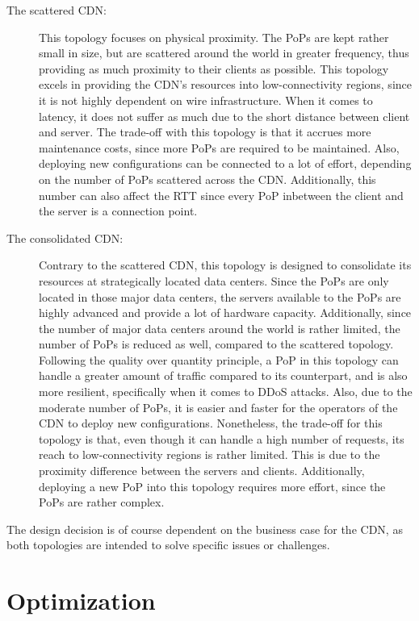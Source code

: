 \begin{description}
	\item[The scattered CDN:] This topology focuses on physical proximity. The PoPs are kept rather small in size, but are scattered around the world in greater frequency, thus providing as much proximity to their clients as possible. This topology excels in providing the CDN's resources into low-connectivity regions, since it is not highly dependent on wire infrastructure. When it comes to latency, it does not suffer as much due to the short distance between client and server. The trade-off with this topology is that it accrues more maintenance costs, since more PoPs are required to be maintained. Also, deploying new configurations can be connected to a lot of effort, depending on the number of PoPs scattered across the CDN. 
	Additionally, this number can also affect the RTT since every PoP inbetween the client and the server is a connection point.
	
	\item[The consolidated CDN:] Contrary to the scattered CDN, this topology is designed to consolidate its resources at strategically located data centers. Since the PoPs are only located in those major data centers, the servers available to the PoPs are highly advanced and provide a lot of hardware capacity. Additionally, since the number of major data centers around the world is rather limited, the number of PoPs is reduced as well, compared to the scattered topology. Following the quality over quantity principle, a PoP in this topology can handle a greater amount of traffic compared to its counterpart, and is also more resilient, specifically when it comes to DDoS attacks. Also, due to the moderate number of PoPs, it is easier and faster for the operators of the CDN to deploy new configurations.
	Nonetheless, the trade-off for this topology is that, even though it can handle a high number of requests, its reach to low-connectivity regions is rather limited. This is due to the proximity difference between the servers and clients. Additionally, deploying a new PoP into this topology requires more effort, since the PoPs are rather complex.	
\end{description}


The design decision is of course dependent on the business case for the CDN, as both topologies are intended to solve specific issues or challenges. \cite{cdn_architecture} 

\section{Optimization}

